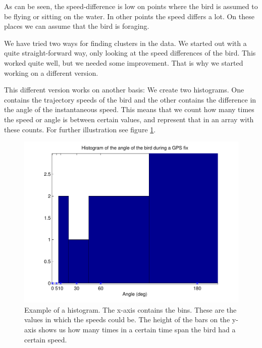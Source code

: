 
 As can be seen, the speed-difference is low on points where the bird is assumed
 to be flying or sitting on the water. In other points the speed differs a lot.
 On these places we can assume that the bird is foraging.

 We have tried two ways for finding clusters in the data. We started out with a
 quite straight-forward way, only looking at the speed differences of the bird.
 This worked quite well, but we needed some improvement. That is why we started
 working on a different version.

 This different version works on another basis: We create two histograms. One
 contains the trajectory speeds of the bird and the other contains the
 difference in the angle of the instantaneous speed. This means that we count
 how many times the speed or angle is between certain values, and represent that
 in an array with these counts. For further illustration see figure
 \ref{fig:histogram}.

\begin{figure}
\centering
\includegraphics[width=.8\textwidth]{histogram.pdf}
\caption{Example of a histogram. The x-axis contains the bins. These are the
values in which the speeds could be. The height of the bars on the y-axis shows
us how many times in a certain time span the bird had a certain speed.}
\label{fig:histogram}
\end{figure}

